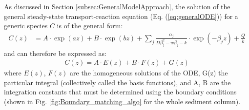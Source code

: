 \documentclass[gmd, manuscript]{copernicus}
\begin{document}
As discussed in Section \ref{subsec:GeneralModelApproach}, the solution of the general steady-state transport-reaction equation (Eq. (\ref{eq:generalODE})) for a generic 
species $C$ is of the general form:
\begin{align}
 C(z) &= A \cdot \exp(az) + B \cdot  \exp(bz) + \sum_j \frac{\alpha_j}{D \beta_j^2-w\beta_j-k}\cdot \exp(-\beta_j z) + \frac{Q}{k} \label{eq:ODE_general_solution}
\end{align}
and can therefore be expressed as:
\begin{align}
C(z) = A \cdot E(z) + B \cdot F(z) + G(z) 
\end{align}
where $E(z)$, $F (z)$ are the homogeneous solutions of the ODE, G(z) the particular integral (collectively called the basis functions), and A, B are the integration constants that must be determined using the boundary conditions 
(shown in Fig. \ref{fig:Boundary_matching_algo} for the whole sediment column).
\end{document}
